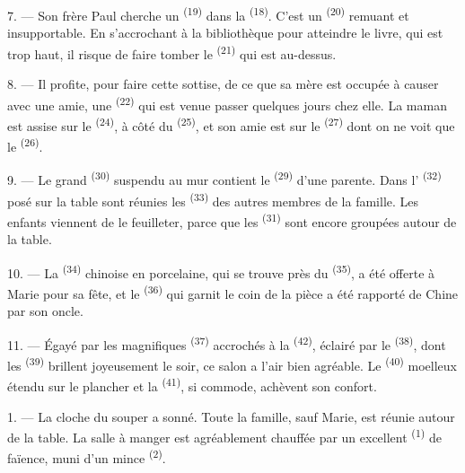 7. --- Son frère Paul cherche un  \textsuperscript{(19)} dans la
 \textsuperscript{(18)}. C'est un 
\textsuperscript{(20)} remuant et insupportable. En s'accrochant à la
bibliothèque pour atteindre le livre, qui est trop haut, il risque de faire
tomber le  \textsuperscript{(21)} qui est au-dessus.

8. --- Il profite, pour faire cette sottise, de ce que sa mère est occupée à
causer avec une amie, une  \textsuperscript{(22)} qui est venue
passer quelques jours chez elle. La maman est assise sur le 
\textsuperscript{(24)}, à côté du  \textsuperscript{(25)}, et
son amie est sur le  \textsuperscript{(27)} dont on ne voit que le
 \textsuperscript{(26)}.

9. --- Le grand  \textsuperscript{(30)} suspendu au mur contient
le  \textsuperscript{(29)} d'une parente. Dans l'
\textsuperscript{(32)} posé sur la table sont réunies les
 \textsuperscript{(33)} des autres membres de la famille.
Les enfants viennent de le feuilleter, parce que les 
\textsuperscript{(31)} sont encore groupées autour de la table.

10. --- La  \textsuperscript{(34)} chinoise en porcelaine, qui
se trouve près du  \textsuperscript{(35)}, a été offerte à
Marie pour sa fête, et le  \textsuperscript{(36)} qui garnit
le coin de la pièce a été rapporté de Chine par son oncle.

11. --- Égayé par les magnifiques  \textsuperscript{(37)}
accrochés à la  \textsuperscript{(42)}, éclairé par le
 \textsuperscript{(38)}, dont les 
\textsuperscript{(39)} brillent joyeusement le soir, ce salon a l'air bien
agréable. Le  \textsuperscript{(40)} moelleux étendu sur le
plancher et la  \textsuperscript{(41)}, si commode,
achèvent son confort.

\VUsaut{3.6mm}
\VUsaut{3.0mm}

1. --- La cloche du souper a sonné. Toute la famille, sauf Marie, est réunie
autour de la table. La salle à manger est agréablement chauffée par un
excellent  \textsuperscript{(1)} de faïence, muni d'un mince
 \textsuperscript{(2)}.

